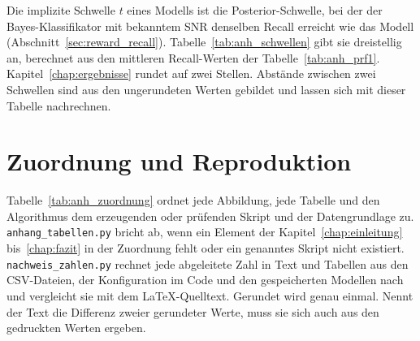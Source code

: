 Die implizite Schwelle $t$ eines Modells ist die Posterior-Schwelle, bei der der Bayes-Klassifikator mit bekanntem SNR denselben Recall erreicht wie das Modell (Abschnitt~\ref{sec:reward_recall}). Tabelle~\ref{tab:anh_schwellen} gibt sie dreistellig an, berechnet aus den mittleren Recall-Werten der Tabelle~\ref{tab:anh_prf1}. Kapitel~\ref{chap:ergebnisse} rundet auf zwei Stellen. Abstände zwischen zwei Schwellen sind aus den ungerundeten Werten gebildet und lassen sich mit dieser Tabelle nachrechnen.

\begin{table}[htbp]
	\centering
	\small
	\renewcommand{\arraystretch}{1.15}
	\caption[Implizite Schwellen aller Verfahren]{Implizite Posterior-Schwelle $t$ je Verfahren und SNR-Stufe ($\pi=0{,}3$) und Soll-Schwelle des Lernziels. Mit Huber-Verlust liegt die Nullstelle des DDQN bei $3/7$ statt $1/3$ (Abschnitt~\ref{sec:dqn_architektur}).}
	\label{tab:anh_schwellen}
	
\end{table}

\section{Zuordnung und Reproduktion}
\label{sec:anh_reproduktion}

Tabelle~\ref{tab:anh_zuordnung} ordnet jede Abbildung, jede Tabelle und den Algorithmus dem erzeugenden oder prüfenden Skript und der Datengrundlage zu. \texttt{anhang\_\allowbreak tabellen.py} bricht ab, wenn ein Element der Kapitel~\ref{chap:einleitung} bis~\ref{chap:fazit} in der Zuordnung fehlt oder ein genanntes Skript nicht existiert. \texttt{nachweis\_\allowbreak zahlen.py} rechnet jede abgeleitete Zahl in Text und Tabellen aus den CSV-Dateien, der Konfiguration im Code und den gespeicherten Modellen nach und vergleicht sie mit dem LaTeX-Quelltext. Gerundet wird genau einmal. Nennt der Text die Differenz zweier gerundeter Werte, muss sie sich auch aus den gedruckten Werten ergeben.

\begin{table}[htbp]
	\centering
	\small
	\setlength{\tabcolsep}{3pt}
	\renewcommand{\arraystretch}{1.12}
	\caption[Zuordnung der Ergebnisse zu Skripten und Daten]{Zuordnung jeder Abbildung, jeder Tabelle und des Algorithmus zum erzeugenden oder prüfenden Skript und zur Datengrundlage.}
	\label{tab:anh_zuordnung}
	
\end{table}

